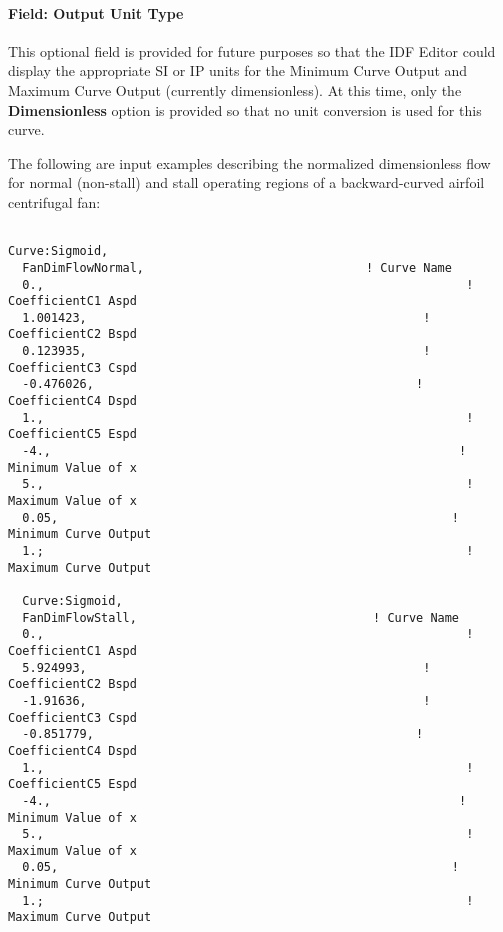 \paragraph{Field: Output Unit Type}\label{field-output-unit-type-12}

This optional field is provided for future purposes so that the IDF Editor could display the appropriate SI or IP units for the Minimum Curve Output and Maximum Curve Output (currently dimensionless). At this time, only the \textbf{Dimensionless} option is provided so that no unit conversion is used for this curve.

The following are input examples describing the normalized dimensionless flow for normal (non-stall) and stall operating regions of a backward-curved airfoil centrifugal fan:

\begin{lstlisting}

Curve:Sigmoid,
  FanDimFlowNormal,                               ! Curve Name
  0.,                                                           ! CoefficientC1 Aspd
  1.001423,                                               ! CoefficientC2 Bspd
  0.123935,                                               ! CoefficientC3 Cspd
  -0.476026,                                             ! CoefficientC4 Dspd
  1.,                                                           ! CoefficientC5 Espd
  -4.,                                                         ! Minimum Value of x
  5.,                                                           ! Maximum Value of x
  0.05,                                                       ! Minimum Curve Output
  1.;                                                           ! Maximum Curve Output

  Curve:Sigmoid,
  FanDimFlowStall,                                 ! Curve Name
  0.,                                                           ! CoefficientC1 Aspd
  5.924993,                                               ! CoefficientC2 Bspd
  -1.91636,                                               ! CoefficientC3 Cspd
  -0.851779,                                             ! CoefficientC4 Dspd
  1.,                                                           ! CoefficientC5 Espd
  -4.,                                                         ! Minimum Value of x
  5.,                                                           ! Maximum Value of x
  0.05,                                                       ! Minimum Curve Output
  1.;                                                           ! Maximum Curve Output
\end{lstlisting}

